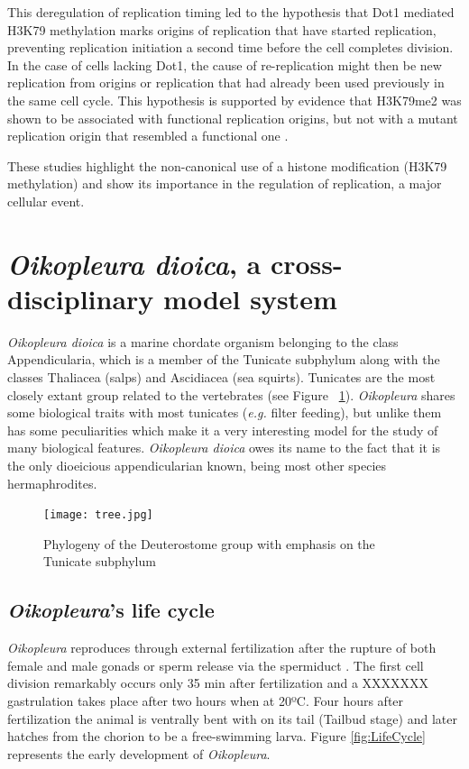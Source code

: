 \documentclass[11pt,twoside,a4paper]{report}
\begin{document}
		This deregulation of replication timing led to the hypothesis that Dot1 mediated H3K79 methylation marks origins of replication that have started replication, preventing replication initiation a second time before the cell completes division. In the case of cells lacking Dot1, the cause of re-replication might then be new replication from origins or replication that had already been used previously in the same cell cycle. This hypothesis is supported by evidence that H3K79me2 was shown to be associated with functional replication origins, but not with a mutant replication origin that resembled a functional one \cite{Fu2013a}.
		
		These studies highlight the non-canonical use of a histone modification (H3K79 methylation) and show its importance in the regulation of replication, a major cellular event.

	
	\section{\textit{Oikopleura dioica}, a cross-disciplinary model system}
		\textit{Oikopleura dioica} is a marine chordate organism belonging to the class Appendicularia, which is a member of the Tunicate subphylum along with the classes Thaliacea (salps) and Ascidiacea (sea squirts). Tunicates are the most closely extant group related to the vertebrates (see Figure ~\ref{fig:tree}). \textit{Oikopleura} shares some biological traits with most tunicates (\textit{e.g.} filter feeding), but unlike them has some peculiarities which make it a very interesting model for the study of many biological features. \textit{Oikopleura dioica} owes its name to the fact that it is the only dioeicious appendicularian known, being most other species hermaphrodites.
		
		\begin{figure}[here]
			\centering
			\texttt{[image: tree.jpg]}
			\caption{Phylogeny of the Deuterostome group with emphasis on the Tunicate subphylum}
			\label{fig:tree}
		\end{figure}
		
		\subsection{	\textit{Oikopleura}'s life cycle}
		\textit{Oikopleura} reproduces through external fertilization after the rupture of both female and male gonads or sperm release via the spermiduct \cite{}. The first cell division remarkably occurs only 35 min after fertilization and a XXXXXXX gastrulation takes place after two hours when at 20ºC. Four hours after fertilization the animal is ventrally bent with on its tail (Tailbud stage) and later hatches from the chorion to be a free-swimming larva. Figure \ref{fig:LifeCycle} represents the early development of \textit{Oikopleura}.
		
\end{document}
